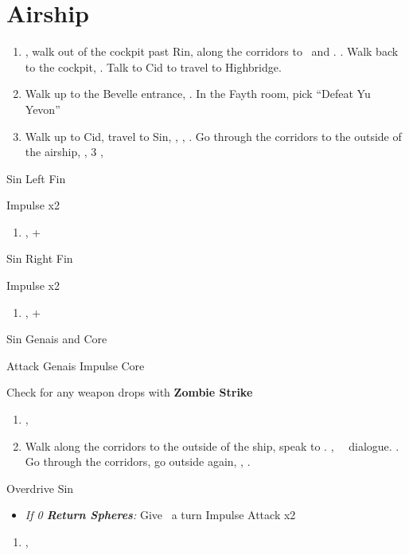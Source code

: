 \chapter{Airship}
\begin{enumerate}
  \item \sd, walk out of the cockpit past Rin, along the corridors to \yuna\ and \kimahri. \sd. Walk back to the cockpit, \sd. Talk to Cid to travel to Highbridge.
  \item Walk up to the Bevelle entrance, \sd. In the Fayth room, pick ``Defeat Yu Yevon''
  \item Walk up to Cid, travel to Sin, \sd, \skippablefmv, \sd. Go through the corridors to the outside of the airship, \sd, 3 \skippablefmv[2:10], \sd
\end{enumerate}
\begin{battle}[65000]{Sin Left Fin}
  \begin{itemize}
    \summon{\bahamut}
    \bahamutf Impulse x2
  \end{itemize}
\end{battle}
\begin{enumerate}[resume]
  \item \sd, \cs+\skippablefmv
\end{enumerate}
\begin{battle}[65000]{Sin Right Fin}
  \begin{itemize}
    \summon{\bahamut}
    \bahamutf Impulse x2
  \end{itemize}
\end{battle}
\begin{enumerate}[resume]
  \item \sd, \cs+\skippablefmv
\end{enumerate}
\begin{battle}[56000]{Sin Genais and Core}
  \begin{itemize}
    \summon{\bahamut}
    \bahamutf Attack Genais
    \bahamutf Impulse Core
  \end{itemize}
  Check for any weapon drops with \textbf{Zombie Strike}
\end{battle}
\begin{enumerate}[resume]
  \item \sd, \skippablefmv
  \item Walk along the corridors to the outside of the ship, speak to \yuna. \cs[1:40], \sd\ \rikku\ dialogue. \skippablefmv. Go through the corridors, go outside again, \skippablefmv, \sd.
\end{enumerate}
\begin{battle}[140000]{Overdrive Sin}
  \begin{itemize}
    \item \textit{If 0 \textbf{Return Spheres}:} Give \tidus\ a turn
          \summon{\bahamut}
          \bahamutf Impulse
          \bahamutf Attack x2
  \end{itemize}
\end{battle}
\begin{enumerate}[resume]
  \item \skippablefmv[1:20], \sd
\end{enumerate}